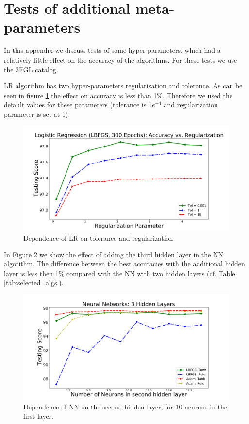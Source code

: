 \section{Tests of additional meta-parameters}

In this appendix we discuss tests of some hyper-parameters, which had a relatively little effect on the 
accuracy of the algorithms. For these tests we use the 3FGL catalog.

LR algorithm has two hyper-parameters regularization and tolerance. 
As can be seen in figure \ref{fig:LR_tol_reg} the effect on accuracy is less than 1\%. Therefore we used the default values for these parameters (tolerance is 1$e^{-4}$ and regularization parameter is set at 1).%
\begin{figure}[h]
\includegraphics[width=\twopicsp\textwidth]{plots/lr_train_reg.pdf}
\caption{Dependence of LR on tolerance and regularization}
\label{fig:LR_tol_reg}
\end{figure}

In Figure \ref{fig:nn_nn} we show the effect of adding the third hidden layer in the NN algorithm.
The difference between the best accuracies with the additional hidden layer is less then 1\%
compared with the NN with two hidden layers (cf. Table \ref{tab:selected_algs}).
\begin{figure}[h]
\includegraphics[width=\twopicsp\textwidth]{plots/nn_2layers_3fgl.pdf}
\caption{Dependence of NN on the second hidden layer, for 10 neurons in the first layer.}
\label{fig:nn_nn}
\end{figure}

